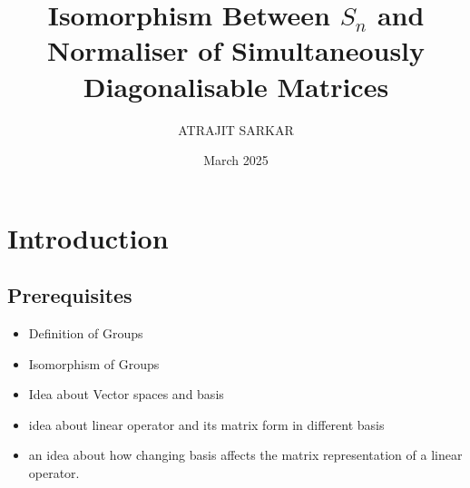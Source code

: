 \documentclass{article}
\title{Isomorphism Between $S_n$ and Normaliser of Simultaneously Diagonalisable Matrices}
\author{ATRAJIT SARKAR}
\date{March 2025}
\theoremstyle{definition}
\theoremstyle{remark}
\begin{document}
\maketitle
\tableofcontents
\newpage

\section{Introduction}
\subsection{Prerequisites}
\begin{itemize}
    \item Definition of Groups
    \item Isomorphism of Groups
    \item Idea about Vector spaces and basis
    \item idea about linear operator and its matrix form in different basis
    \item an idea about how changing basis affects the matrix representation of a linear operator.
\end{itemize}
\end{document}
